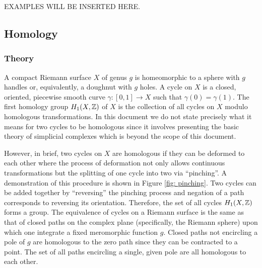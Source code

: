 EXAMPLES WILL BE INSERTED HERE.

\vspace{24pt}


\subsection{Homology} \label{sec: homology}

%
\subsubsection*{Theory}
%

A compact Riemann surface $X$ of genus $g$ is homeomorphic to a sphere
with $g$ handles or, equivalently, a doughnut with $g$ holes. A cycle on
$X$ is a closed, oriented, piecewise smooth curve $\gamma : [0,1] \to X$
such that $\gamma(0) = \gamma(1)$. The first homology group $H_1(X,\operatorname{\mathbb{Z}})$
of $X$ is the collection of all cycles on $X$ modulo homologous
transformations. In this document we do not state precisely what it
means for two cycles to be homologous since it involves presenting the
basic theory of simplicial complexes which is beyond the scope of this
document.

However, in brief, two cycles on $X$ are homologous if they can be
deformed to each other where the process of deformation not only allows
continuous transformations but the splitting of one cycle into two via
``pinching''. A demonstration of this procedure is shown in Figure
\ref{fig: pinching}. Two cycles can be added together by ``reversing''
the pinching process and negation of a path corresponds to reversing its
orientation. Therefore, the set of all cycles $H_1(X,\operatorname{\mathbb{Z}})$ forms a
group. The equivalence of cycles on a Riemann surface is the same as
that of closed paths on the complex plane (specifically, the Riemann
sphere) upon which one integrate a fixed meromorphic function
$g$. Closed paths not encircling a pole of $g$ are homologous to the
zero path since they can be contracted to a point. The set of all paths
encircling a single, given pole are all homologous to each other.

